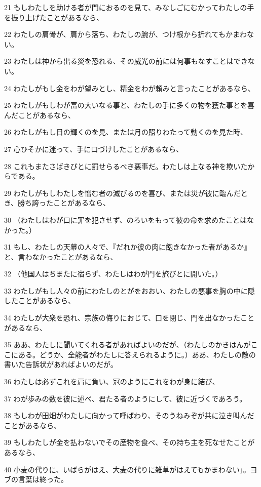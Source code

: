\par 21 もしわたしを助ける者が門におるのを見て、みなしごにむかってわたしの手を振り上げたことがあるなら、
\par 22 わたしの肩骨が、肩から落ち、わたしの腕が、つけ根から折れてもかまわない。
\par 23 わたしは神から出る災を恐れる、その威光の前には何事もなすことはできない。
\par 24 わたしがもし金をわが望みとし、精金をわが頼みと言ったことがあるなら、
\par 25 わたしがもしわが富の大いなる事と、わたしの手に多くの物を獲た事とを喜んだことがあるなら、
\par 26 わたしがもし日の輝くのを見、または月の照りわたって動くのを見た時、
\par 27 心ひそかに迷って、手に口づけしたことがあるなら、
\par 28 これもまたさばきびとに罰せらるべき悪事だ。わたしは上なる神を欺いたからである。
\par 29 わたしがもしわたしを憎む者の滅びるのを喜び、または災が彼に臨んだとき、勝ち誇ったことがあるなら、
\par 30 （わたしはわが口に罪を犯させず、のろいをもって彼の命を求めたことはなかった。）
\par 31 もし、わたしの天幕の人々で、『だれか彼の肉に飽きなかった者があるか』と、言わなかったことがあるなら、
\par 32 （他国人はちまたに宿らず、わたしはわが門を旅びとに開いた。）
\par 33 わたしがもし人々の前にわたしのとがをおおい、わたしの悪事を胸の中に隠したことがあるなら、
\par 34 わたしが大衆を恐れ、宗族の侮りにおじて、口を閉じ、門を出なかったことがあるなら、
\par 35 ああ、わたしに聞いてくれる者があればよいのだが、（わたしのかきはんがここにある。どうか、全能者がわたしに答えられるように。）ああ、わたしの敵の書いた告訴状があればよいのだが。
\par 36 わたしは必ずこれを肩に負い、冠のようにこれをわが身に結び、
\par 37 わが歩みの数を彼に述べ、君たる者のようにして、彼に近づくであろう。
\par 38 もしわが田畑がわたしに向かって呼ばわり、そのうねみぞが共に泣き叫んだことがあるなら、
\par 39 もしわたしが金を払わないでその産物を食べ、その持ち主を死なせたことがあるなら、
\par 40 小麦の代りに、いばらがはえ、大麦の代りに雑草がはえてもかまわない」。ヨブの言葉は終った。

